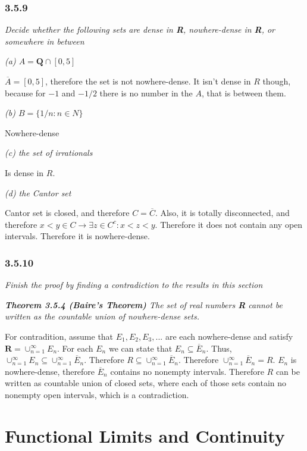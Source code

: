 \documentclass[11pt,oneside,titlepage]{book}
\begin{document}
\subsection*{3.5.9}
\textit{Decide whether the following sets are dense in \textbf{R},
  nowhere-dense in \textbf{R}, or somewhere in between}

\textit{(a) $A = \textbf{Q} \cap [0, 5]$}

$\overline A = [0, 5]$, therefore the set is not nowhere-dense. It isn't
dense in $R$ though, because for $-1$ and $-1/2$ there is no number in the
$A$, that is between them.

\textit{(b) $B = \{1/n: n \in N\}$}

Nowhere-dense

\textit{(c) the set of irrationals}

Is dense in $R$.

\textit{(d) the Cantor set}

Cantor set is closed, and therefore $C = \overline C$. Also, it is totally
disconnected, and therefore $x < y \in C \to \exists z \in C^c: x < z < y$.
Therefore it does not contain any open intervals. Therefore it
is nowhere-dense.

\subsection*{3.5.10}
\textit{Finish the proof by finding a contradiction to the results in this
  section}

\textit{\textbf{Theorem 3.5.4 (Baire's Theorem)} The set of real numbers
  \textbf{R} cannot be written as the countable union of nowhere-dense sets.}

For contradition, assume that $E_1, E_2, E_3, ... $ are each nowhere-dense and
satisfy $\textbf{R} = \cup_{n = 1}^{\infty} E_n$. For each $E_n$ we can state
that $E_n \subseteq \overline E_n$. Thus, $\cup_{n = 1}^{\infty} E_n \subseteq
\cup_{n = 1}^{\infty} \overline E_n$. Therefore
$R \subseteq \cup_{n = 1}^{\infty} \overline E_n$. Therefore
$\cup_{n = 1}^{\infty} \overline E_n = R$. $E_n$ is nowhere-dense, therefore
$\overline E_n$ contains no nonempty intervals. Therefore $R$ can be written as
countable union of closed sets, where each of those sets contain no nonempty
open intervals, which is a contradiction.

\chapter{Functional Limits and Continuity}
\end{document}
